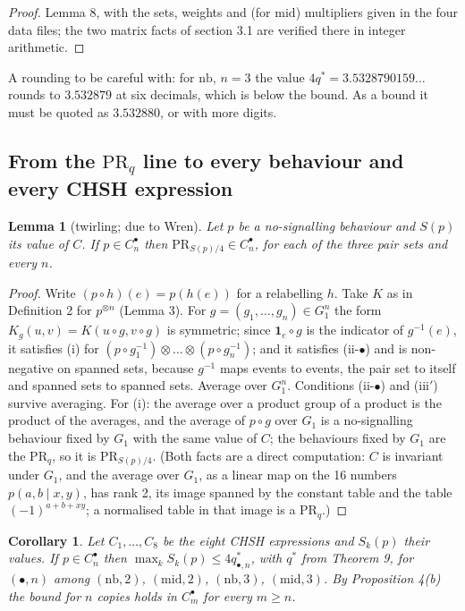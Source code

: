 \documentclass[11pt,a4paper]{article}
\newtheorem{lemma}[theorem]{Lemma}
\newtheorem{corollary}[theorem]{Corollary}
\theoremstyle{definition}
\theoremstyle{remark}
\newcommand{\PR}{\mathrm{PR}}
\newcommand{\ind}[1]{\mathbf{1}_{#1}}
\newcommand{\nb}{\mathrm{nb}}
\newcommand{\md}{\mathrm{mid}}
\newcommand{\ps}{\bullet}
\begin{document}
\begin{proof}
Lemma 8, with the sets, weights and (for $\md$) multipliers given in the four data files; the two matrix facts of section 3.1 are verified there in integer arithmetic.
\end{proof}

A rounding to be careful with: for $\nb$, $n = 3$ the value $4q^* = 3.5328790159\ldots$ rounds to $3.532879$ at six decimals, which is below the bound. As a bound it must be quoted as $3.532880$, or with more digits.

\subsection{From the $\PR_q$ line to every behaviour and every CHSH expression}

\begin{lemma}[twirling; due to Wren]\label{l:twirl}
Let $p$ be a no-signalling behaviour and $S(p)$ its value of $C$. If $p \in C_n^{\ps}$ then $\PR_{S(p)/4} \in C_n^{\ps}$, for each of the three pair sets and every $n$.
\end{lemma}

\begin{proof}
Write $(p \circ h)(e) = p(h(e))$ for a relabelling $h$. Take $K$ as in Definition 2 for $p^{\otimes n}$ (Lemma 3). For $g = (g_1, \dots, g_n) \in G_1^n$ the form $K_g(u, v) = K(u \circ g, v \circ g)$ is symmetric; since $\ind{e} \circ g$ is the indicator of $g^{-1}(e)$, it satisfies (i) for $(p \circ g_1^{-1}) \otimes \dots \otimes (p \circ g_n^{-1})$; and it satisfies (ii-$\ps$) and is non-negative on spanned sets, because $g^{-1}$ maps events to events, the pair set to itself and spanned sets to spanned sets. Average over $G_1^n$. Conditions (ii-$\ps$) and (iii$'$) survive averaging. For (i): the average over a product group of a product is the product of the averages, and the average of $p \circ g$ over $G_1$ is a no-signalling behaviour fixed by $G_1$ with the same value of $C$; the behaviours fixed by $G_1$ are the $\PR_q$, so it is $\PR_{S(p)/4}$. (Both facts are a direct computation: $C$ is invariant under $G_1$, and the average over $G_1$, as a linear map on the 16 numbers $p(a, b \mid x, y)$, has rank 2, its image spanned by the constant table and the table $(-1)^{a+b+xy}$; a normalised table in that image is a $\PR_q$.)
\end{proof}

\begin{corollary}\label{c:all}
Let $C_1, \dots, C_8$ be the eight CHSH expressions and $S_k(p)$ their values. If $p \in C_n^{\ps}$ then $\max_k S_k(p) \le 4 q^*_{\ps,n}$, with $q^*$ from Theorem 9, for $(\ps, n)$ among $(\nb, 2)$, $(\md, 2)$, $(\nb, 3)$, $(\md, 3)$. By Proposition 4(b) the bound for $n$ copies holds in $C_m^{\ps}$ for every $m \ge n$.
\end{corollary}
\end{document}
